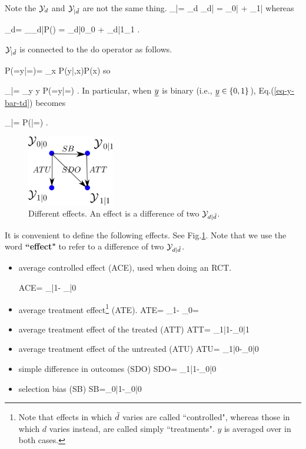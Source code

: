 Note the 
 ${\cal Y}_d$ and ${\cal Y}_{|{\tilde{d}}}$
are not the same thing.
\beq
\caly_{|\td}=
\sum_d \caly_{d|\td}
=
\caly_{0|\td} +
 \caly_{1|\td}
\eeq
whereas

\beq
\caly_d=
\sum_\td \caly_{d|\td}P(\td)
= \caly_{d|0}\pi_0
+
\caly_{d|1}\pi_{1}
\;.
\eeq


${\cal Y}_{|{\tilde{d}}}$
is connected to the do operator as follows.

\beq
P(\rvy=y|\rho \rvd=\td)=
\sum_x P(y|\td,x)P(x)
\eeq
so

\beq
\caly_{|\td}=
\sum_y y P(\rvy=y|\rho \rvd=\td)
\;.
\label{eq-y-bar-td}
\eeq
In particular, when
${\underline{y}}$ is binary 
(i.e.,  ${\underline{y}}\in\{0,1\}$), 
Eq.(\ref{eq-y-bar-td}) becomes

\beq
\caly_{|\td}=
P(|\rho\rvd=\td)
\;.
\eeq

\begin{figure}[h!]
\centering
\includegraphics[width=1.5in]
{pot-out/y-diffs-square.png}
\caption{Different effects.  
An effect is a difference of 
two ${\cal Y}_{d|{\tilde{d}}}$.} 
\label{fig-y-diffs-square}
\end{figure}

It is convenient to
define the following effects. 
See Fig.\ref{fig-y-diffs-square}.
Note
that we use  the
word {\bf ``effect"} to
refer to 
a difference of two  ${\cal Y}_{d|{\tilde{d}}}$.

\begin{itemize}

\item average controlled effect  
 (ACE), used when doing an RCT.

\beq
{\color{red}ACE}=
\caly_{|1}-
\caly_{|0}
\eeq

\item average treatment effect\footnote{
Note that effects in which ${\tilde{d}}$ varies
are called
``controlled",
whereas those in which $d$ varies instead,
 are called simply ``treatments".
$y$ is averaged over
in both cases.}
 (ATE).
\beq
{\color{red}ATE}=
\caly_{1}-
\caly_{0}= \delta
\eeq

\item average treatment effect 
of the treated (ATT)
\beq
{\color{red}ATT}=
\caly_{1|1}-\caly_{0|1}
\eeq

\item average
treatment effect of the untreated (ATU)
\beq
{\color{red}ATU}=
\caly_{1|0}-\caly_{0|0}
\eeq

\item simple difference in outcomes (SDO)
\beq
{\color{red} SDO}= \caly_{1|1}-\caly_{0|0}
\eeq

\item selection bias (SB)
\beq
{\color{red}SB}=\caly_{0|1}-\caly_{0|0}
\eeq
\end{itemize}

